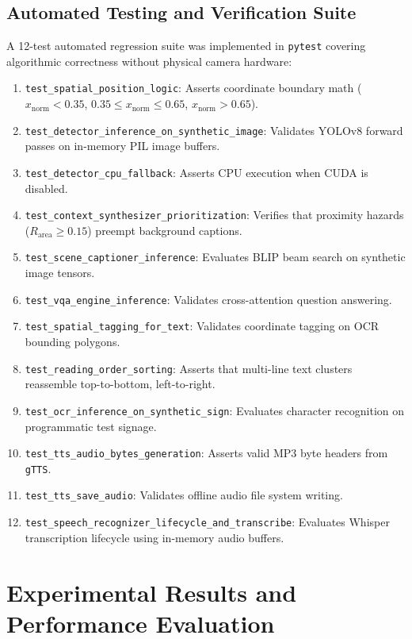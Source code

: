 \documentclass[conference]{IEEEtran}
\begin{document}
\subsection{Automated Testing and Verification Suite}
A 12-test automated regression suite was implemented in \texttt{pytest} covering algorithmic correctness without physical camera hardware:
\begin{enumerate}
    \item \texttt{test\_spatial\_position\_logic}: Asserts coordinate boundary math ($x_{\text{norm}} < 0.35$, $0.35 \le x_{\text{norm}} \le 0.65$, $x_{\text{norm}} > 0.65$).
    \item \texttt{test\_detector\_inference\_on\_synthetic\_image}: Validates YOLOv8 forward passes on in-memory PIL image buffers.
    \item \texttt{test\_detector\_cpu\_fallback}: Asserts CPU execution when CUDA is disabled.
    \item \texttt{test\_context\_synthesizer\_prioritization}: Verifies that proximity hazards ($R_{\text{area}} \ge 0.15$) preempt background captions.
    \item \texttt{test\_scene\_captioner\_inference}: Evaluates BLIP beam search on synthetic image tensors.
    \item \texttt{test\_vqa\_engine\_inference}: Validates cross-attention question answering.
    \item \texttt{test\_spatial\_tagging\_for\_text}: Validates coordinate tagging on OCR bounding polygons.
    \item \texttt{test\_reading\_order\_sorting}: Asserts that multi-line text clusters reassemble top-to-bottom, left-to-right.
    \item \texttt{test\_ocr\_inference\_on\_synthetic\_sign}: Evaluates character recognition on programmatic test signage.
    \item \texttt{test\_tts\_audio\_bytes\_generation}: Asserts valid MP3 byte headers from \texttt{gTTS}.
    \item \texttt{test\_tts\_save\_audio}: Validates offline audio file system writing.
    \item \texttt{test\_speech\_recognizer\_lifecycle\_and\_transcribe}: Evaluates Whisper transcription lifecycle using in-memory audio buffers.
\end{enumerate}

\section{Experimental Results and Performance Evaluation}
\end{document}
